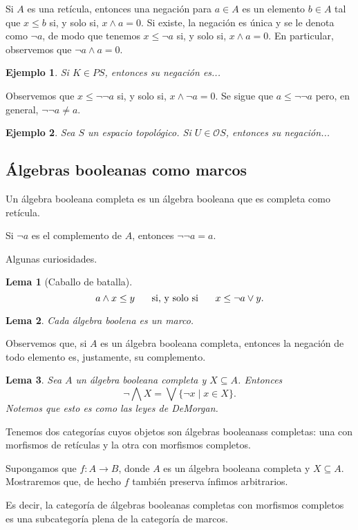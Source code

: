 \documentclass[12pt,letterpaper,titlepage]{article}
\newtheorem*{exa}{Ejemplo}
\newtheorem*{lemma}{Lema}
\theoremstyle{definition}
\renewcommand\sup{\vee}
\newcommand\Sup{\bigvee}
\renewcommand\inf{\wedge}
\newcommand\Inf{\bigwedge}
\renewcommand\cal[1]{\mathcal{#1}}
\newcommand\ssi{\hspace{5mm}\text{ si, y solo si }\hspace{5mm}}
\newcommand\<{\langle}
\renewcommand\>{\rangle}
\begin{document}
Si $A$ es una retícula, entonces una
negación para $a\in A$ es un elemento $b\in A$ tal que
$x\leq b$ si, y solo si, $x\inf a=0$.
Si existe, la negación es única y se le denota como $\neg a$, de
modo que tenemos 
$x\leq \neg a$ si, y solo si, $x\inf a=0$.
En particular, observemos que $\neg a\inf a = 0$.

\begin{exa}
  Si $K\in PS$, entonces su negación es...
\end{exa}

Observemos que $x\leq \neg\neg a$ si, y solo si, $x\inf\neg a=
0$.
Se sigue que $a\leq\neg\neg a$ pero, en general, $\neg\neg a \neq a$.

\begin{exa}
  Sea $S$ un espacio topológico.
  Si $U\in\cal O S$, entonces su negación...
\end{exa}

\subsection{Álgebras booleanas como marcos}
Un álgebra booleana completa es un álgebra booleana que es
completa como retícula.

Si $\neg a$ es el complemento de $A$, entonces $\neg\neg a=a$.

Algunas curiosidades.
\begin{lemma}[Caballo de batalla]
  \[
    a\inf x \leq y  \ssi x\leq \neg a\sup y
  .\]
\end{lemma}
\begin{lemma}
  Cada álgebra boolena es un marco.
\end{lemma}
Observemos que, si $A$ es un álgebra booleana completa, entonces
la negación de todo elemento es, justamente, su complemento.
\begin{lemma}
  Sea $A$ un álgebra booleana completa y $X\subseteq A$.
  Entonces
  \[
    \neg \Inf X = \Sup \{\neg x \mid x\in X\}
  .\]
  Notemos que esto es como las leyes de DeMorgan.
\end{lemma}

Tenemos dos categorías cuyos objetos son álgebras booleanass
completas: una con morfismos de retículas y la otra con morfismos
completos.

Supongamos que $f:A\to B$, donde $A$ es un álgebra booleana
completa y $X\subseteq A$.
Mostraremos que, de hecho $f$ también preserva ínfimos
arbitrarios.

Es decir, la categoría de álgebras booleanas completas con
morfismos completos es una subcategoría plena de la categoría de
marcos.
\end{document}
